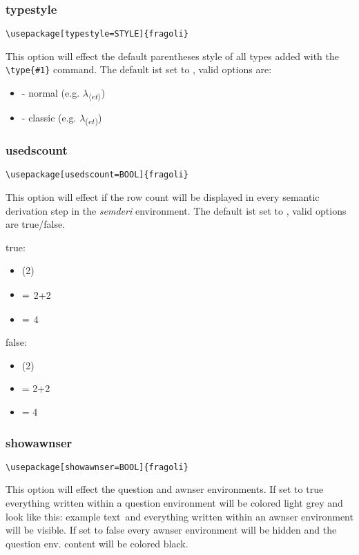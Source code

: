 \documentclass[10pt, a4paper]{article}
\newenvironment{itemizeexample}{
	\begin{itemize}
		\setlength\itemsep{-.5em}
	}
	{
	\end{itemize}
}
\begin{document}
	\subsubsection{typestyle}
	\begin{lstlisting}[style=A]
	\usepackage[typestyle=STYLE]{fragoli}
	\end{lstlisting}
	This option will effect the default parentheses style of all types added with the \verb=\type{#1}= command. The default ist set to \texttt{}, valid options are:
	\begin{itemizeexample}
		\item[-] normal (e.g. $\lambda$\textsubscript{$\langle$$et$$\rangle$})
		\item[-] classic (e.g. $\lambda$\textsubscript{($et$)})
	\end{itemizeexample}
	\subsubsection{usedscount}
	\begin{lstlisting}[style=A]
	\usepackage[usedscount=BOOL]{fragoli}
	\end{lstlisting}
	This option will effect if the row count will be displayed in every semantic derivation step in the \textit{semderi} environment. The default ist set to \texttt{}, valid options are true/false.
	\begin{center}
		\begin{minipage}[h][2cm][t]{15em}
			true:\begin{itemizeexample}
				\item[] (2)
				\item[$\stackrel{\color{deivationrowcountcolor}2.\color{black}}{=}$] 2+2
				\item[$\stackrel{\color{deivationrowcountcolor}3.\color{black}}{=}$] 4
			\end{itemizeexample}
		\end{minipage}
		\begin{minipage}[h][2cm][t]{15em}
			false:\begin{itemizeexample}
				\item[] (2)
				\item[=] 2+2
				\item[=] 4
			\end{itemizeexample}
		\end{minipage}
	\end{center}
	\subsubsection{showawnser}
	\begin{lstlisting}[style=A]
	\usepackage[showawnser=BOOL]{fragoli}
	\end{lstlisting}
	This option will effect the question and awnser environments. If set to true everything written within a question environment will be colored light grey and look like this: \color{dunkelgrau}example text\color{black}\ and everything written within an awnser environment will be visible. If set to false every awnser environment will be hidden and the question env. content will be colored black.
\end{document}
